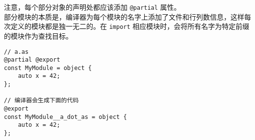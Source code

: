 注意，每个部分对象的声明处都应该添加 \lstinline!@partial! 属性。 \\

部分模块的本质是，编译器为每个模块的名字上添加了文件和行列数信息，这样每次定义的模块都是独一无二的。在 \lstinline!import! 相应模块时，会将所有名字为特定前缀的模块作为查找目标。

\begin{minipage}[c]{0.95\textwidth}
\vspace{1.0em}
\begin{lstlisting}
// a.as
@partial @export
const MyModule = object {
	auto x = 42;
};

// 编译器会生成下面的代码
@export
const MyModule__a_dot_as = object {
    auto x = 42;
};
\end{lstlisting}
\end{minipage}